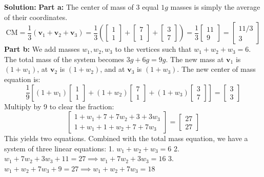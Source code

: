 \documentclass[11pt]{article}
\begin{document}
\textbf{Solution:}
\textbf{Part a:} The center of mass of 3 equal $1g$ masses is simply the average of their coordinates.
\[ \text{CM} = \frac{1}{3}(\mathbf{v}_1 + \mathbf{v}_2 + \mathbf{v}_3) = \frac{1}{3}\left( \begin{bmatrix} 1 \\ 1 \end{bmatrix} + \begin{bmatrix} 7 \\ 1 \end{bmatrix} + \begin{bmatrix} 3 \\ 7 \end{bmatrix} \right) = \frac{1}{3}\begin{bmatrix} 11 \\ 9 \end{bmatrix} = \begin{bmatrix} 11/3 \\ 3 \end{bmatrix} \]
\textbf{Part b:} We add masses $w_1, w_2, w_3$ to the vertices such that $w_1 + w_2 + w_3 = 6$. The total mass of the system becomes $3g + 6g = 9g$.
The new mass at $\mathbf{v}_1$ is $(1 + w_1)$, at $\mathbf{v}_2$ is $(1 + w_2)$, and at $\mathbf{v}_3$ is $(1 + w_3)$.
The new center of mass equation is:
\[ \frac{1}{9}\left[ (1+w_1)\begin{bmatrix} 1 \\ 1 \end{bmatrix} + (1+w_2)\begin{bmatrix} 7 \\ 1 \end{bmatrix} + (1+w_3)\begin{bmatrix} 3 \\ 7 \end{bmatrix} \right] = \begin{bmatrix} 3 \\ 3 \end{bmatrix} \]
Multiply by 9 to clear the fraction:
\[ \begin{bmatrix} 1+w_1 + 7+7w_2 + 3+3w_3 \\ 1+w_1 + 1+w_2 + 7+7w_3 \end{bmatrix} = \begin{bmatrix} 27 \\ 27 \end{bmatrix} \]
This yields two equations. Combined with the total mass equation, we have a system of three linear equations:
1. $w_1 + w_2 + w_3 = 6$
2. $w_1 + 7w_2 + 3w_3 + 11 = 27 \implies w_1 + 7w_2 + 3w_3 = 16$
3. $w_1 + w_2 + 7w_3 + 9 = 27 \implies w_1 + w_2 + 7w_3 = 18$
\end{document}
